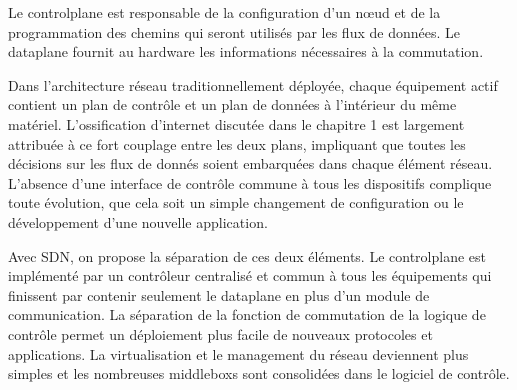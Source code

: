 
Le \gls{controlplane} est responsable de la configuration d'un nœud et de la programmation des chemins qui seront utilisés par les flux de données. Le \gls{dataplane} fournit au hardware les informations nécessaires à la commutation. \cite{ImplementationChallengesForSDNBackground}



Dans l'architecture réseau traditionnellement déployée, chaque équipement actif contient un plan de contrôle et un plan de données à l'intérieur du même matériel. L'ossification d'internet discutée dans le chapitre 1 est largement attribuée à ce fort couplage entre les deux plans, impliquant que toutes les décisions sur les flux de donnés soient embarquées dans chaque élément réseau. L'absence d'une interface de contrôle commune à tous les dispositifs complique toute évolution, que cela soit un simple changement de configuration ou le développement d'une nouvelle application. \cite{SurveySDNArchi}




Avec SDN, on propose la séparation de ces deux éléments. Le \gls{controlplane} est implémenté par un contrôleur centralisé et commun à tous les équipements qui finissent par contenir seulement le \gls{dataplane} en plus d'un module de communication.  La séparation de la fonction de commutation de la logique de contrôle permet un déploiement plus facile de nouveaux protocoles et applications. La virtualisation et le management du réseau deviennent plus simples et les nombreuses \glspl{middlebox} sont consolidées dans le logiciel de contrôle. \cite{SurveySDNArchi} \cite{SDNNewNormONFExecutiveSummary}

